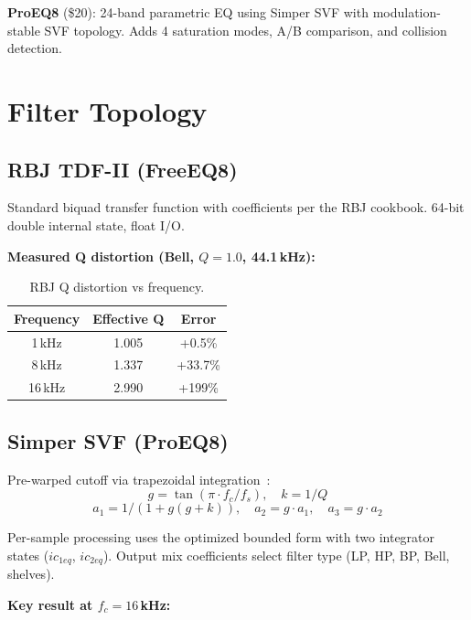 \documentclass[twoside,a4paper]{article}
\begin{document}
\textbf{ProEQ8} (\$20): 24-band parametric EQ using Simper SVF with modulation-stable SVF topology. Adds 4 saturation modes, A/B comparison, and collision detection.

\section{Filter Topology}
\label{sec:topology}

\subsection{RBJ TDF-II (FreeEQ8)}

Standard biquad transfer function with coefficients per the RBJ cookbook. 64-bit double internal state, float I/O.

\textbf{Measured Q distortion (Bell, $Q=1.0$, 44.1\,kHz):}

\begin{table}[ht]
  \caption{RBJ Q distortion vs frequency.}
  \centering
  \begin{tabular}{ccc}
    \toprule
    Frequency & Effective Q & Error \\
    \midrule
    1\,kHz & 1.005 & +0.5\% \\
    8\,kHz & 1.337 & +33.7\% \\
    16\,kHz & 2.990 & +199\% \\
    \bottomrule
  \end{tabular}
  \label{tab:qdistortion}
\end{table}

\subsection{Simper SVF (ProEQ8)}

Pre-warped cutoff via trapezoidal integration~\cite{Simper2013}:
\begin{equation}
g = \tan(\pi \cdot f_c / f_s), \quad k = 1/Q
\end{equation}
\begin{equation}
a_1 = 1 / (1 + g(g + k)), \quad a_2 = g \cdot a_1, \quad a_3 = g \cdot a_2
\end{equation}

Per-sample processing uses the optimized bounded form with two integrator states ($ic_{1eq}$, $ic_{2eq}$). Output mix coefficients select filter type (LP, HP, BP, Bell, shelves).

\textbf{Key result at $f_c = 16$\,kHz:}
\end{document}
